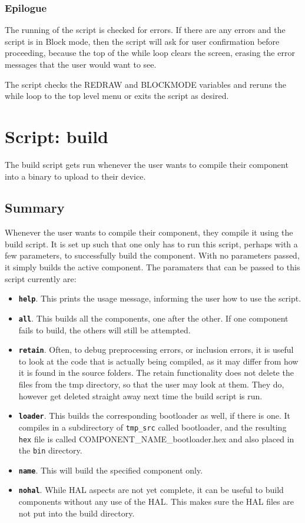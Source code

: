 \documentclass[a4paper, oneside, 11pt, titlepage, onecolumn, openright]{report}
\begin{document}
\subsubsection{Epilogue}
			\label{sss:VFstartEpilogue}
			The running of the script is checked for errors. If there are any errors and the script is in Block mode, then the script will ask for user confirmation before proceeding, because the top of the while loop clears the screen, erasing the error messages that the user would want to see.
			
			The script checks the REDRAW and BLOCKMODE variables and reruns the while loop to the top level menu or exits the script as desired.
			
\section{Script: build}
			\label{s:build}
			The build script gets run whenever the user wants to compile their component into a binary to upload to their device.
			
\subsection{Summary}
			\label{ss:buildSummary}
			Whenever the user wants to compile their component, they compile it using the build script. It is set up such that one only has to run this script, perhaps with a few parameters, to successfully build the component. With no parameters passed, it simply builds the active component.
			The paramaters that can be passed to this script currently are:
			
\begin{itemize}
\item \texttt{\textbf{help}}. This prints the usage message, informing the user how to use the script.
\item \texttt{\textbf{all}}. This builds all the components, one after the other. If one component fails to build, the others will still be attempted.
\item \texttt{\textbf{retain}}. Often, to debug preprocessing errors, or inclusion errors, it is useful to look at the code that is actually being compiled, as it may differ from how it is found in the source folders. The retain functionality does not delete the files from the tmp directory, so that the user may look at them. They do, however get deleted straight away next time the build script is run.
\item \texttt{\textbf{loader}}. This builds the corresponding bootloader as well, if there is one. It compiles in a subdirectory of \texttt{tmp\_src} called bootloader, and the resulting \texttt{hex} file is called COMPONENT\_NAME\_bootloader.hex and also placed in the \texttt{bin} directory.
\item \texttt{\textbf{name}}. This will build the specified component only.
\item \texttt{\textbf{nohal}}. While HAL aspects are not yet complete, it can be useful to build components without any use of the HAL. This makes sure the HAL files are not put into the build directory.
\end{itemize}
\end{document}
